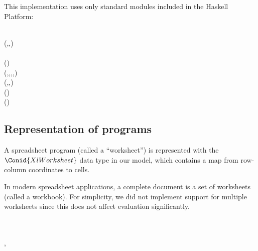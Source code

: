 
This implementation uses only standard modules included in the Haskell Platform:

\begin{hscode}\SaveRestoreHook
{}%
%
\>[B]{}\;\;\<[E]%
\\[\blanklineskip]%
\>[B]{}\;\;(,,){}\<[E]%
\\
\>[B]{}\;\<[E]%
\\
\>[B]{}\;\;(){}\<[E]%
\\
\>[B]{}\;\;\;\;(,,,,){}\<[E]%
\\
\>[B]{}\;\;\;\;(,,){}\<[E]%
\\
\>[B]{}\;\;(){}\<[E]%
\\
\>[B]{}\;\;\;\;\;(){}\<[E]%
\ColumnHook
\end{hscode}\resethooks

\subsection{Representation of programs}

A spreadsheet program (called a ``worksheet'') is represented with the
\ensuremath{\Conid{XlWorksheet}} data type in our model, which contains a map from row-column
coordinates to cells.

In modern spreadsheet applications, a complete document is a set of worksheets
(called a workbook). For simplicity, we did not implement support for multiple
worksheets since this does not affect evaluation significantly.

\begin{hscode}\SaveRestoreHook
{}%
%
%
\>[B]{}\;\mathrel{=}\;\<[E]%
\\
\>[B]{}\<[4]%
\>[4]{}\;\<[E]%
\\[\blanklineskip]%
\>[B]{}\;\mathrel{=}\;\llparenthesis \cdot , \cdot \rrparenthesis \;\<[E]%
\ColumnHook
\end{hscode}\resethooks

